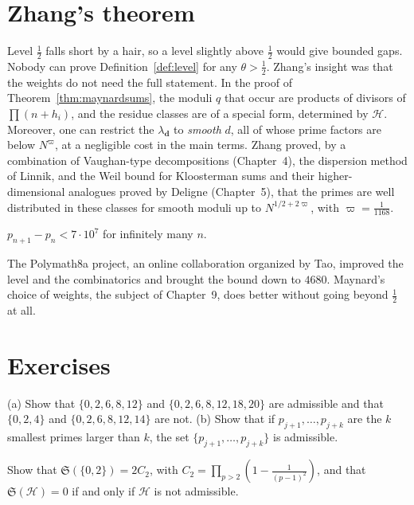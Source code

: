 \section{Zhang's theorem}

Level $\frac12$ falls short by a hair, so a level slightly above $\frac12$ would give bounded gaps. Nobody can prove Definition~\ref{def:level} for any $\theta>\frac12$. Zhang's insight was that the weights do not need the full statement. In the proof of Theorem~\ref{thm:maynardsums}, the moduli $q$ that occur are products of divisors of $\prod(n+h_i)$, and the residue classes are of a special form, determined by $\mathcal H$. Moreover, one can restrict the $\lambda_{\mathbf d}$ to \emph{smooth} $d$, all of whose prime factors are below $N^\varpi$, at a negligible cost in the main terms. Zhang proved, by a combination of Vaughan-type decompositions (Chapter~4), the dispersion method of Linnik, and the Weil bound for Kloosterman sums and their higher-dimensional analogues proved by Deligne (Chapter~5), that the primes are well distributed in these classes for smooth moduli up to $N^{1/2+2\varpi}$, with $\varpi=\frac1{1168}$.

\begin{theorem}\label{thm:zhang}
$p_{n+1}-p_n<7\cdot10^7$ for infinitely many $n$.
\end{theorem}

The Polymath8a project, an online collaboration organized by Tao, improved the level and the combinatorics and brought the bound down to $4680$. Maynard's choice of weights, the subject of Chapter~9, does better without going beyond $\frac12$ at all.

\section{Exercises}

\begin{exercise}[$\star$]\label{ex:admiss}
(a) Show that $\{0,2,6,8,12\}$ and $\{0,2,6,8,12,18,20\}$ are admissible and that $\{0,2,4\}$ and $\{0,2,6,8,12,14\}$ are not.
(b) Show that if $p_{j+1},\dots,p_{j+k}$ are the $k$ smallest primes larger than $k$, the set $\{p_{j+1},\dots,p_{j+k}\}$ is admissible.
\end{exercise}

\begin{exercise}[$\star$]\label{ex:singtwin}
Show that $\mathfrak S(\{0,2\})=2C_2$, with $C_2=\prod_{p>2}(1-\frac1{(p-1)^2})$, and that $\mathfrak S(\mathcal H)=0$ if and only if $\mathcal H$ is not admissible.
\end{exercise}

